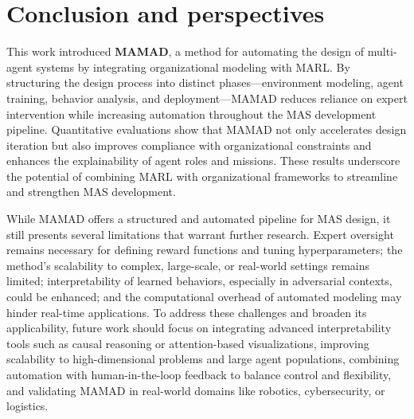 \documentclass[pdflatex,sn-mathphys-num]{sn-jnl}%
\theoremstyle{thmstyleone}%
\theoremstyle{thmstyletwo}%
\theoremstyle{thmstylethree}%
\begin{document}
\section{Conclusion and perspectives}\label{sec:conclusion}

This work introduced \textbf{MAMAD}, a method for automating the design of multi-agent systems by integrating organizational modeling with MARL. By structuring the design process into distinct phases—environment modeling, agent training, behavior analysis, and deployment—MAMAD reduces reliance on expert intervention while increasing automation throughout the MAS development pipeline. Quantitative evaluations show that MAMAD not only accelerates design iteration but also improves compliance with organizational constraints and enhances the explainability of agent roles and missions. These results underscore the potential of combining MARL with organizational frameworks to streamline and strengthen MAS development.

While MAMAD offers a structured and automated pipeline for MAS design, it still presents several limitations that warrant further research. Expert oversight remains necessary for defining reward functions and tuning hyperparameters; the method's scalability to complex, large-scale, or real-world settings remains limited; interpretability of learned behaviors, especially in adversarial contexts, could be enhanced; and the computational overhead of automated modeling may hinder real-time applications. To address these challenges and broaden its applicability, future work should focus on integrating advanced interpretability tools such as causal reasoning or attention-based visualizations, improving scalability to high-dimensional problems and large agent populations, combining automation with human-in-the-loop feedback to balance control and flexibility, and validating MAMAD in real-world domains like robotics, cybersecurity, or logistics.
\end{document}
